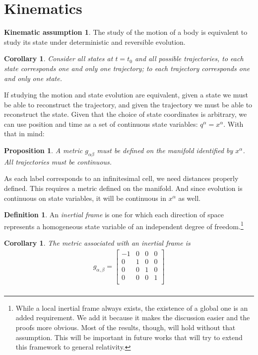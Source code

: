 \documentclass[aps,pra,10pt,twocolumn,floatfix,nofootinbib]{revtex4-1}
\newtheorem{cor}[thm]{Corollary}
\newtheorem{prop}[thm]{Proposition}
\theoremstyle{definition}
\newtheorem{defn}[thm]{Definition}
\newtheorem*{assump3}{Kinematic assumption}
\begin{document}
\section{Kinematics}
\begin{assump3}\label{kinematicAssumption}
The study of the motion of a body is equivalent to study its state under deterministic and reversible evolution.
\end{assump3}

\begin{cor}\label{}
Consider all states at $t=t_0$ and all possible trajectories, to each state corresponds one and only one trajectory; to each trajectory corresponds one and only one state.
\end{cor}

If studying the motion and state evolution are equivalent, given a state we must be able to reconstruct the trajectory, and given the trajectory we must be able to reconstruct the state. Given that the choice of state coordinates is arbitrary, we can use position and time as a set of continuous state variables: $q^\alpha = x^\alpha$. With that in mind:

\begin{prop}\label{}
A metric $g_{\alpha\beta}$ must be defined on the manifold identified by $x^\alpha$. All trajectories must be continuous.
\end{prop}

As each label corresponds to an infinitesimal cell, we need distances properly defined. This requires a metric defined on the manifold. And since evolution is continuous on state variables, it will be continuous in $x^\alpha$ as well.

\begin{defn}\label{continuousLabels}
An \emph{inertial frame} is one for which each direction of space represents a homogeneous state variable of an independent degree of freedom.\footnote{While a local inertial frame always exists, the existence of a global one is an added requirement. We add it because it makes the discussion easier and the proofs more obvious. Most of the results, though, will hold without that assumption. This will be important in future works that will try to extend this framework to general relativity.}
\end{defn}

\begin{cor}\label{continuousLabels}
The metric associated with an inertial frame is
\begin{align*}
g_{\alpha, \beta} =  \left[
  \begin{array}{cccc}
    -1 & 0 & 0 & 0 \\
    0 & 1 & 0 & 0 \\
    0 & 0 & 1 & 0 \\
    0 & 0 & 0 & 1 \\
  \end{array}
\right] \\
\end{align*}
\end{cor}
\end{document}
